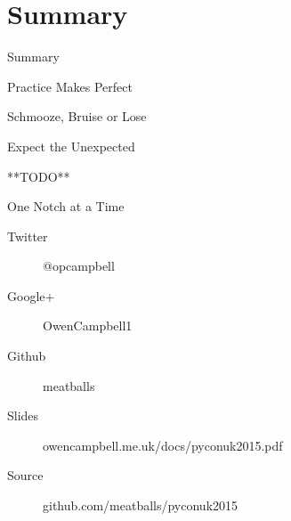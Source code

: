 \documentclass[14pt]{beamer}
\begin{document}
  \section*{Summary}

    \begin{frame}{Summary}
      \begin{description}
        \pause
        \item Practice Makes Perfect
        \pause
        \item [Authority] Schmooze, Bruise or Lose
        \pause
        \item [Priorities] Expect the Unexpected
        \pause
        \item [Process] **TODO**
        \pause
        \item [Style] One Notch at a Time
      \end{description}
    \end{frame}

    \begin{frame}{}
      \begin{description}
        \item [Twitter] @opcampbell
        \item [Google+] OwenCampbell1
        \item [Github] meatballs
      \end{description}
      \vfill
      \begin{description}
        \item [Slides] {\small owencampbell.me.uk/docs/pyconuk2015.pdf}
        \item [Source] {\small github.com/meatballs/pyconuk2015}
      \end{description}
    \end{frame}
\end{document}
